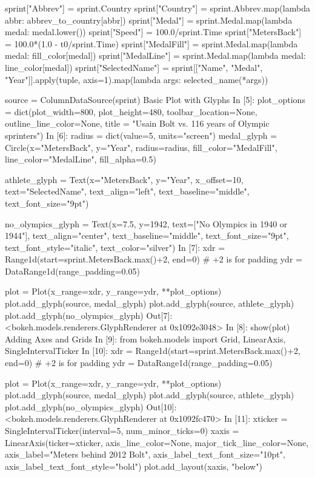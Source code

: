sprint["Abbrev"]       = sprint.Country
sprint["Country"]      = sprint.Abbrev.map(lambda abbr: abbrev_to_country[abbr])
sprint["Medal"]        = sprint.Medal.map(lambda medal: medal.lower())
sprint["Speed"]        = 100.0/sprint.Time
sprint["MetersBack"]   = 100.0*(1.0 - t0/sprint.Time)
sprint["MedalFill"]    = sprint.Medal.map(lambda medal: fill_color[medal])
sprint["MedalLine"]    = sprint.Medal.map(lambda medal: line_color[medal])
sprint["SelectedName"] = sprint[["Name", "Medal", "Year"]].apply(tuple, axis=1).map(lambda args: selected_name(*args))

source = ColumnDataSource(sprint)
Basic Plot with Glyphs
In [5]:
plot_options = dict(plot_width=800, plot_height=480, toolbar_location=None, 
                    outline_line_color=None, title = "Usain Bolt vs. 116 years of Olympic sprinters")
In [6]:
radius = dict(value=5, units="screen")
medal_glyph = Circle(x="MetersBack", y="Year", radius=radius, fill_color="MedalFill", 
                     line_color="MedalLine", fill_alpha=0.5)

athlete_glyph = Text(x="MetersBack", y="Year", x_offset=10, text="SelectedName",
    text_align="left", text_baseline="middle", text_font_size="9pt")

no_olympics_glyph = Text(x=7.5, y=1942, text=["No Olympics in 1940 or 1944"],
    text_align="center", text_baseline="middle",
    text_font_size="9pt", text_font_style="italic", text_color="silver")
In [7]:
xdr = Range1d(start=sprint.MetersBack.max()+2, end=0)  # +2 is for padding
ydr = DataRange1d(range_padding=0.05)  

plot = Plot(x_range=xdr, y_range=ydr, **plot_options)
plot.add_glyph(source, medal_glyph)
plot.add_glyph(source, athlete_glyph)
plot.add_glyph(no_olympics_glyph)
Out[7]:
<bokeh.models.renderers.GlyphRenderer at 0x1092e3048>
In [8]:
show(plot)
Adding Axes and Grids
In [9]:
from bokeh.models import Grid, LinearAxis, SingleIntervalTicker
In [10]:
xdr = Range1d(start=sprint.MetersBack.max()+2, end=0)  # +2 is for padding
ydr = DataRange1d(range_padding=0.05)  

plot = Plot(x_range=xdr, y_range=ydr, **plot_options)
plot.add_glyph(source, medal_glyph)
plot.add_glyph(source, athlete_glyph)
plot.add_glyph(no_olympics_glyph)
Out[10]:
<bokeh.models.renderers.GlyphRenderer at 0x1092fc470>
In [11]:
xticker = SingleIntervalTicker(interval=5, num_minor_ticks=0)
xaxis = LinearAxis(ticker=xticker, axis_line_color=None, major_tick_line_color=None,
                   axis_label="Meters behind 2012 Bolt", axis_label_text_font_size="10pt", 
                   axis_label_text_font_style="bold")
plot.add_layout(xaxis, "below")

